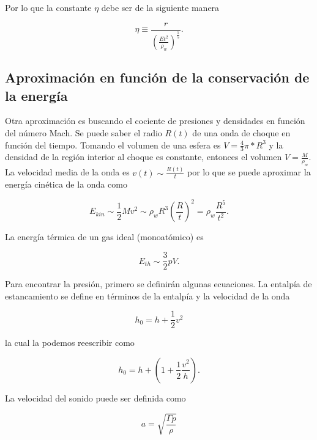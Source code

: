 \documentclass[12pt,a4paper]{book}
\begin{document}
\noindent Por lo que la constante $\eta$ debe ser de la siguiente manera

\begin{equation}
  \eta \equiv \frac{r}{\left( \frac{Et^2}{\rho_w} \right)^{\frac{1}{5}}}.
\end{equation}



\subsection{Aproximación en función de la conservación de la energía}

Otra aproximación es buscando el cociente de presiones y densidades en función del número Mach.
Se puede saber el radio $R(t)$ de una onda de choque en función del tiempo. Tomando el volumen de una esfera es $V = \frac{4}{3} \pi * R^3$ y la densidad de la región interior al choque es constante, entonces 
el volumen $V = \frac{M}{\rho_w}$. La velocidad media de la onda es $v(t) \sim \frac{R(t)}{t} $
por lo que se puede aproximar la energía cinética de la onda como 

\begin{equation}
	E_{kin} \sim \frac{1}{2} M v^2 \sim \rho_w R^3 \left( \frac{R}{t} \right) ^2 = \rho_w \frac{R^5}{t^2}.
\end{equation}

\noindent La energía térmica de un gas ideal (monoatómico) es 

\begin{equation} \label{eq_energia_termica}
	E_{th} \sim \frac{3}{2}pV.
\end{equation}

\noindent Para encontrar la presión, primero se definirán algunas ecuaciones. La entalpía de estancamiento se define en términos de la entalpía y la velocidad de la onda 

\begin{equation}
	h_0 = h + \frac{1}{2} v^2
\end{equation}

\noindent la cual la podemos reescribir como

\begin{equation} \label{eq_entalpía}
	h_0 = h + \left( 1 +\frac{1}{2} \frac{v^2}{h} \right).
\end{equation}

\noindent La velocidad del sonido puede ser definida como 

\begin{equation} \label{eq_sonido_1}
	a = \sqrt{\frac{\Gamma p}{\rho}}
\end{equation}
\end{document}
